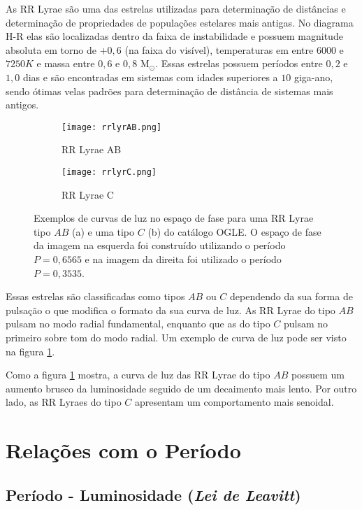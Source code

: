 As RR Lyrae são uma das estrelas utilizadas para determinação de distâncias e determinação de propriedades de populações estelares mais antigas. No diagrama H-R elas são localizadas dentro da faixa de instabilidade e possuem magnitude absoluta em torno de $+0,6$ (na faixa do visível), temperaturas em entre $6000$ e $7250 \si{K}$ e massa entre $0,6$ e $0,8$ M$_\odot$. Essas estrelas possuem períodos entre $0,2$ e $1,0$ dias e são encontradas em sistemas com idades superiores a $10$ giga-ano, sendo ótimas velas padrões para determinação de distância de sistemas mais antigos.

\begin{figure}[!ht]
\centering
\begin{subfigure}{.5\textwidth}
  \centering
  \texttt{[image: rrlyrAB.png]}
  \caption{RR Lyrae AB}
\end{subfigure}%
\begin{subfigure}{.5\textwidth}
  \centering
  \texttt{[image: rrlyrC.png]}
  \caption{RR Lyrae C}
\end{subfigure}
\caption[Curva de luz de RR Lyrae]{Exemplos de curvas de luz no espaço de fase para uma  RR Lyrae tipo $AB$ (a) e uma tipo $C$ (b) do catálogo OGLE. O espaço de fase da imagem na esquerda foi construído utilizando o período $P=0,6565$ e na imagem da direita foi utilizado o período $P=0,3535$.}
\label{fig:exemplo_rrlyr}
\end{figure}


Essas estrelas são classificadas como tipos $AB$ ou $C$ dependendo da sua forma de pulsação o que modifica o formato da sua curva de luz. As RR Lyrae do tipo $AB$ pulsam no modo radial fundamental, enquanto que as do tipo $C$ pulsam no primeiro sobre tom do modo radial. Um exemplo de curva de luz pode ser visto na figura \ref{fig:exemplo_rrlyr}.


Como a figura \ref{fig:exemplo_rrlyr} mostra, a curva de luz das RR Lyrae do tipo $AB$ possuem um aumento brusco da luminosidade seguido de um decaimento mais lento. Por outro lado, as RR Lyraes do tipo $C$ apresentam um comportamento mais senoidal.

\section{Relações com o Período}

\subsection{Período - Luminosidade (\textit{Lei de Leavitt})}

